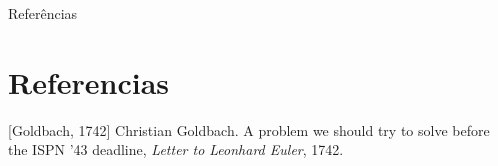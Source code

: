 \documentclass[xcolor=dvipsnames]{beamer}
\begin{document}
\begin{frame}{Referências}
  \section{Referencias}
  \begin{thebibliography}{10}
	 [Goldbach, 1742]
	 Christian Goldbach.
	 \newblock A problem we should try to solve before the ISPN ’43 deadline,
	 \newblock \emph{Letter to Leonhard Euler}, 1742.
\end{thebibliography}
\end{frame}
\end{document}
